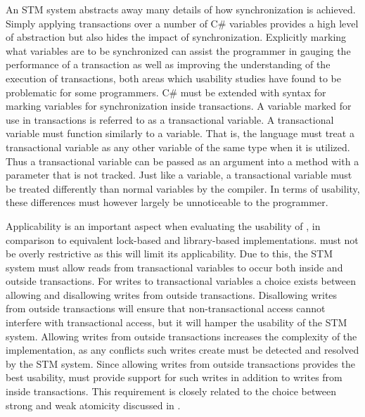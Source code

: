 An \ac{STM} system abstracts away many details of how synchronization is achieved. Simply applying transactions over a number of C\# variables provides a high level of abstraction but also hides the impact of synchronization. Explicitly marking what variables are to be synchronized can assist the programmer in gauging the performance of a transaction as well as improving the understanding of the execution of transactions, both areas which usability studies\cite{rossbach2010transactional}\cite{pankratius2009does} have found to be problematic for some programmers. C\# must be extended with syntax for marking variables for synchronization inside transactions. A variable marked for use in transactions is referred to as a transactional variable. A transactional variable must function similarly to a  variable. That is, the language must treat a transactional variable as any other variable of the same type when it is utilized. Thus a transactional variable can be passed as an argument into a method with a parameter that is not tracked. Just like a  variable, a transactional variable must be treated differently than normal variables by the compiler. In terms of usability, these differences must however largely be unnoticeable to the programmer.

Applicability is an important aspect when evaluating the usability of \stmname, in comparison to equivalent lock-based and library-based implementations. \stmnamesp must not be overly restrictive as this will limit its applicability. Due to this, the \ac{STM} system must allow reads from transactional variables to occur both inside and outside transactions. For writes to transactional variables a choice exists between allowing and disallowing writes from outside transactions. Disallowing writes from outside transactions will ensure that non-transactional access cannot interfere with transactional access, but it will hamper the usability of the \ac{STM} system. Allowing writes from outside transactions increases the complexity of the implementation, as any conflicts such writes create must be detected and resolved by the \ac{STM} system. Since allowing writes from outside transactions provides the best usability, \stmnamesp must provide support for such writes in addition to writes from inside transactions. This requirement is closely related to the choice between strong and weak atomicity discussed in .

